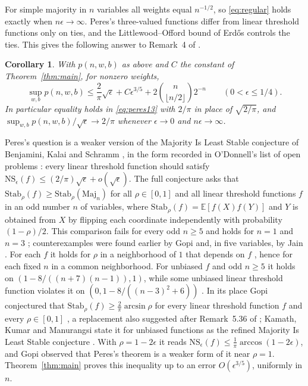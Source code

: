 \documentclass[11pt]{amsart}
\newtheorem{corollary}[theorem]{Corollary}
\theoremstyle{remark}
\numberwithin{equation}{section}
\newcommand{\EE}{\mathbb{E}}
\begin{document}
For simple majority in $n$ variables all weights equal $n^{-1/2}$, so \eqref{eq:regular} holds exactly when $n\epsilon\to\infty$. Peres's three-valued functions differ from linear threshold functions only on ties, and the Littlewood--Offord bound of Erd\H{o}s \cite{Erd45} controls the ties. This gives the following answer to Remark~4 of \cite{Per04}.

\begin{corollary}\label{cor:peres}
With $p(n,w,b)$ as above and $C$ the constant of Theorem~\ref{thm:main}, for nonzero weights,
\[
\sup_{w,b}p(n,w,b)\le\frac2\pi\sqrt\epsilon+C\epsilon^{3/5}+2\binom{n}{\lfloor n/2\rfloor}2^{-n}\qquad(0<\epsilon\le1/4).
\]
In particular equality holds in \eqref{eq:peres13} with $2/\pi$ in place of $\sqrt{2/\pi}$, and $\sup_{w,b}p(n,w,b)/\sqrt\epsilon\to2/\pi$ whenever $\epsilon\to0$ and $n\epsilon\to\infty$.
\end{corollary}

Peres's question is a weaker version of the Majority Is Least Stable conjecture of Benjamini, Kalai and Schramm \cite{BKS}, in the form recorded in O'Donnell's list of open problems \cite{OD12}: every linear threshold function should satisfy $\mathrm{NS}_\epsilon(f)\le(2/\pi)\sqrt\epsilon+o(\sqrt\epsilon)$. The full conjecture asks that $\mathrm{Stab}_\rho(f)\ge\mathrm{Stab}_\rho(\mathrm{Maj}_n)$ for all $\rho\in[0,1]$ and all linear threshold functions $f$ in an odd number $n$ of variables, where $\mathrm{Stab}_\rho(f)=\EE[f(X)f(Y)]$ and $Y$ is obtained from $X$ by flipping each coordinate independently with probability $(1-\rho)/2$. This comparison fails for every odd $n\ge5$ and holds for $n=1$ and $n=3$ \cite[Theorem~2]{BS23}; counterexamples were found earlier by Gopi \cite{Gop13} and, in five variables, by Jain \cite{Jai17}. For each $f$ it holds for $\rho$ in a neighborhood of $1$ that depends on $f$ \cite[Corollary~5]{Gop13}, hence for each fixed $n$ in a common neighborhood. For unbiased $f$ and odd $n\ge5$ it holds on $(1-8/((n+7)(n-1)),1)$, while some unbiased linear threshold function violates it on $(0,1-8/((n-3)^2+6))$ \cite[Theorems~9 and~10]{KKM26}. In its place Gopi conjectured that $\mathrm{Stab}_\rho(f)\ge\frac2\pi\arcsin\rho$ for every linear threshold function $f$ and every $\rho\in[0,1]$ \cite[Conjecture~3]{Gop13}, a replacement also suggested after Remark~5.36 of \cite{OD14}; Kamath, Kumar and Manurangsi state it for unbiased functions as the refined Majority Is Least Stable conjecture \cite[Conjecture~1]{KKM26}. With $\rho=1-2\epsilon$ it reads $\mathrm{NS}_\epsilon(f)\le\frac1\pi\arccos(1-2\epsilon)$, and Gopi observed that Peres's theorem is a weaker form of it near $\rho=1$. Theorem~\ref{thm:main} proves this inequality up to an error $O(\epsilon^{3/5})$, uniformly in $n$.
\end{document}
